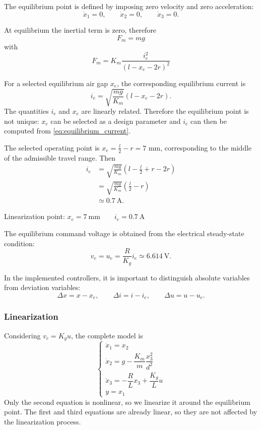 The equilibrium point is defined by imposing zero velocity and zero acceleration:
\begin{equation*}
    \dot{x}_1 = 0, \qquad \dot{x}_2 = 0, \qquad \dot{x}_3 = 0.
\end{equation*}

At equilibrium the inertial term is zero, therefore
\begin{equation*}
    F_m = mg
\end{equation*}
with 
\begin{equation*}
    F_m = K_m \frac{i_e^2}{(l - x_e - 2r)^2}
\end{equation*}

For a selected equilibrium air gap $x_e$, the corresponding equilibrium current is
\begin{equation}
    i_e = \sqrt{\frac{m g}{K_m}} (l - x_e - 2r).
    \label{eq:equilibrium_current}
\end{equation}
The quantities $i_e$ and $x_e$ are linearly related. Therefore the equilibrium point is not unique:
$x_e$ can be selected as a design parameter and $i_e$ can then be computed from
\eqref{eq:equilibrium_current}.

The selected operating point is $x_e = \frac{l}{2} - r = 7$ mm, corresponding to the middle of
the admissible travel range. Then
\begin{equation*}
\begin{aligned}
i_e 
&= \sqrt{\frac{m g}{K_m}}
\left(l - \frac{l}{2} + r - 2r\right) \\[1mm]
&= \sqrt{\frac{m g}{K_m}}
\left(\frac{l}{2} - r\right) \\[1mm]
&\simeq 0.7 \ \mathrm{A}.
\end{aligned}
\end{equation*}

Linearization point: $
\boxed{x_e = 7\ \text{mm} \qquad i_e = 0.7\ \text{A}}
$

The equilibrium command voltage is obtained from the electrical steady-state condition:
\[
   v_e = u_e = \frac{R}{K_g} i_e \simeq 6.614\ \text{V}.
\]

In the implemented controllers, it is important to distinguish absolute variables from deviation variables:
\begin{equation*}
    \Delta x = x - x_e, \qquad \Delta i = i - i_e, \qquad \Delta u = u - u_e.
\end{equation*}

\subsubsection{Linearization}
Considering $v_c = K_g u$, the complete model is
\[
\begin{cases}
    \dot{x}_1 = x_2 \\[2mm]
    \dot{x}_2 = g - \dfrac{K_m}{m}\dfrac{x_3^2}{d^2} \\[2mm]
    \dot{x}_3 = -\dfrac{R}{L}x_3 + \dfrac{K_g}{L}u \\[2mm]
    y = x_1
\end{cases}
\]
Only the second equation is nonlinear, so we linearize it around the equilibrium point.
The first and third equations are already linear, so they are not affected by the linearization process.


